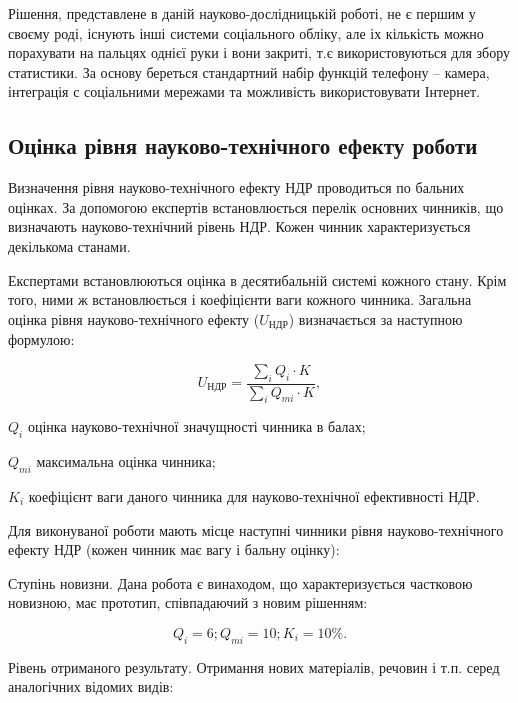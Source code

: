 Рішення, представлене в даній науково-дослідницькій роботі, не є першим у своєму роді, існують інші системи соціального обліку, але іх кількість можно порахувати на пальцях однієї руки і вони закриті, т.є використовуються для збору статистики. За основу береться стандартний набір функцій телефону – камера, інтеграція с соціальними мережами та можливість використовувати Інтернет.
    \subsection{Оцінка рівня науково-технічного ефекту роботи}
Визначення рівня науково-технічного ефекту НДР проводиться по бальних оцінках. За допомогою експертів встановлюється перелік основних чинників, що визначають науково-технічний рівень НДР. Кожен чинник характеризується декількома станами.

Експертами встановлюються оцінка в десятибальній системі кожного стану. Крім того, ними ж встановлюється і коефіцієнти ваги кожного чинника. Загальна оцінка рівня науково-технічного ефекту ($U_{\text{НДР}}$) визначається за наступною формулою:
  
\begin{equation}
U_{\text{НДР}} =  \frac{\sum \limits_{i} Q_i   \cdot   K}{\sum \limits_{i} Q_{mi}   \cdot   K}, \nonumber
\end{equation}

\begin{formulaDescription}
\item [\mbox{$ Q_i $}] оцінка науково-технічної значущності чинника в балах;
\item [\mbox{$ Q_{mi} $}] максимальна оцінка чинника;
\item [\mbox{$ K_i $}] коефіцієнт ваги даного чинника для науково-технічної ефективності НДР.
\end{formulaDescription}  


Для виконуваної роботи мають місце наступні чинники рівня науково-технічного ефекту НДР (кожен чинник має вагу і бальну оцінку):

Ступінь новизни. Дана робота є винаходом, що характеризується частковою новизною, має прототип, співпадаючий з новим рішенням:

\begin{equation}
Q_i = 6; Q_{mi} = 10; K_i = 10\%. \nonumber
\end{equation}

Рівень отриманого результату. Отримання нових матеріалів, речовин і т.п. серед аналогічних відомих видів:

